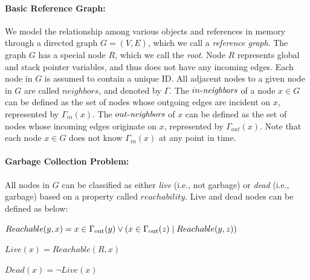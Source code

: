 \paragraph{Basic Reference Graph:}
We model the relationship among various objects and references in memory through a directed graph $G = (V, E)$, which we call a {\it reference graph}.
The graph $G$ has a special node $R$, which we call the {\it root}. Node $R$
represents
global and stack pointer variables, and
thus does not have any incoming edges.
Each node in $G$ is assumed to contain a unique ID. %
All adjacent nodes to a given node in $G$ are called $neighbors$, and denoted by $\Gamma$. The
$\mathop{\mbox{$in$-$\mathit{neighbors}$}}$ of a node $x\in G$ can be defined as the set of nodes whose outgoing edges
are incident on $x$, represented by $\Gamma_{in}(x)$. The $\mathop{\mbox{$out$-$\mathit{neighbors}$}}$ of $x$ can be defined as the set
of nodes whose incoming edges originate on $x$, represented by $\Gamma_{out}(x)$.
Note that each node $x\in G$ does not know $\Gamma_{in}(x)$ at any point in time.

\paragraph{Garbage Collection Problem:}
All nodes in $G$ can be classified as either {\em live} (i.e., not garbage) or {\em dead} (i.e., garbage) based on a property called
$reachability$. Live and dead nodes can be defined as below:




$Reachable(y,x) = x \in \Gamma_{\rm out}(y) \lor (x \in \Gamma_{\rm out}(z) \mid Reachable(y,z))$

$Live(x) = Reachable(R,x)$

$Dead(x) = \neg Live(x)$

